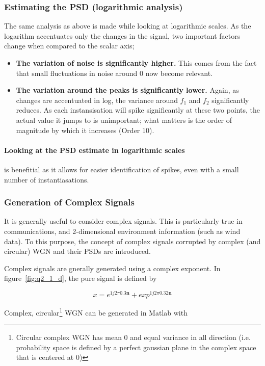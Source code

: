 \documentclass[main.tex]{subfiles}
\begin{document}
\subsubsection{Estimating the PSD (logarithmic analysis)}


The same analysis as above is made while looking at logarithmic scales. As the logarithm accentuates only the changes in the signal, two important factors change when compared to the scalar axis;

\begin{itemize}
	\item \textbf{The variation of noise is significantly higher.} This comes from the fact that small fluctuations in noise around 0 now become relevant.
	\item \textbf{The variation around the peaks is significantly lower.} Again, as changes are accentuated in log, the variance around $f_1$ and $f_2$ significantly reduces. As each instansisation will spike significantly at these two points, the actual value it jumps to is unimportant; what matters is the order of magnitude by which it increases (Order 10).
\end{itemize}

\paragraph{Looking at the PSD estimate in logarithmic scales} is benefitial as it allows for easier identification of spikes, even with a small number of instantiasations.

\subsubsection{Generation of Complex Signals}

It is generally useful to consider complex signals. This is particularly true in communications, and 2-dimensional environment information (such as wind data). To this purpose, the concept of complex signals corrupted by complex (and circular) WGN and their PSDs are introduced.

Complex signals are gnerally generated using a complex exponent. In figure~\ref{fig:q2_1_d}, the pure signal is defined by

\[
x = e^{1j2\pi 0.3\textbf{n}} + exp^{1j2\pi 0.32\textbf{n}}
\]

Complex, circular\footnote{Circular complex WGN has mean 0 and equal variance in all direction (i.e. probability space is defined by a perfect gaussian plane in the complex space that is centered at 0)} WGN can be generated in Matlab with
\end{document}
